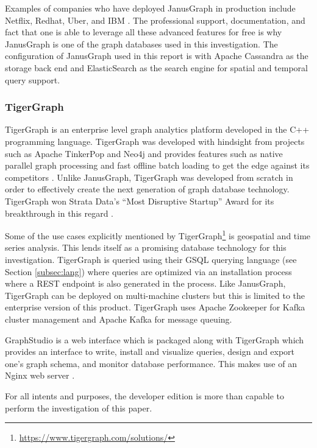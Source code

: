 Examples of companies who have deployed JanusGraph in production include Netflix, Redhat, Uber, and IBM \cite{janusgraph-readme}. The professional support, documentation, and fact that one is able to leverage all these advanced features for free is why JanusGraph is one of the graph databases used in this investigation. The configuration of JanusGraph used in this report is with Apache Cassandra as the storage back end and ElasticSearch as the search engine for spatial and temporal query support.

\subsubsection{TigerGraph}

TigerGraph is an enterprise level graph analytics platform developed in the C++ programming language. TigerGraph was developed with hindsight from projects such as Apache TinkerPop and Neo4j and provides features such as native parallel graph processing and fast offline batch loading to get the edge against its competitors \cite{tigergraph-benchmark} \cite{conference-trip}. Unlike JanusGraph, TigerGraph was developed from scratch in order to effectively create the next generation of graph database technology. TigerGraph won Strata Data’s ``Most Disruptive Startup'' Award for its breakthrough in this regard \cite{tigergraph-award}.

Some of the use cases explicitly mentioned by TigerGraph\footnote{\url{https://www.tigergraph.com/solutions/}} is geospatial and time series analysis. This lends itself as a promising database technology for this investigation. TigerGraph is queried using their GSQL querying language (see Section \ref{subsec:lang}) where queries are optimized via an installation process where a REST endpoint is also generated in the process. Like JanusGraph, TigerGraph can be deployed on multi-machine clusters but this is limited to the enterprise version of this product. TigerGraph uses Apache Zookeeper for Kafka cluster management and Apache Kafka for message queuing.

GraphStudio is a web interface which is packaged along with TigerGraph which provides an interface to write, install and visualize queries, design and export one's graph schema, and monitor database performance. This makes use of an Nginx web server \cite{tigergraph-infoworld}.

For all intents and purposes, the developer edition is more than capable to perform the investigation of this paper.

